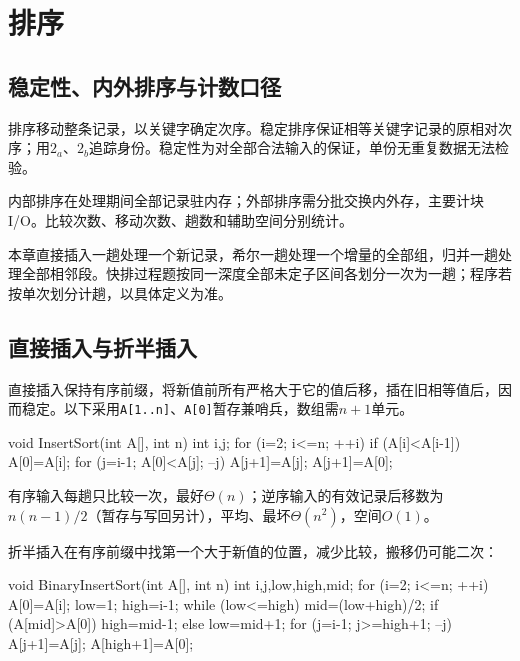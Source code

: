 \chapter{排序}\label{DS08}

\section{稳定性、内外排序与计数口径}\label{DS08-definition}

排序移动整条记录，以关键字确定次序。稳定排序保证相等关键字记录的原相对次序；用\(2_a、2_b\)追踪身份。稳定性为对全部合法输入的保证，单份无重复数据无法检验。

内部排序在处理期间全部记录驻内存；外部排序需分批交换内外存，主要计块I/O。比较次数、移动次数、趟数和辅助空间分别统计。

本章直接插入一趟处理一个新记录，希尔一趟处理一个增量的全部组，归并一趟处理全部相邻段。快排过程题按同一深度全部未定子区间各划分一次为一趟；程序若按单次划分计趟，以具体定义为准。

\section{直接插入与折半插入}\label{DS08-insertion}

直接插入保持有序前缀，将新值前所有严格大于它的值后移，插在旧相等值后，因而稳定。以下采用\texttt{A[\allowbreak{}1.\allowbreak{}.\allowbreak{}n]\allowbreak{}}、\texttt{A[\allowbreak{}0]\allowbreak{}}暂存兼哨兵，数组需\(n+1\)单元。

\par\smallskip\noindent\begin{minipage}{\linewidth}
\begin{codeblock}[language={C++}]
void InsertSort(int A[], int n) {
    int i,j;
    for (i=2; i<=n; ++i)
        if (A[i]<A[i-1]) {
            A[0]=A[i];
            for (j=i-1; A[0]<A[j]; --j)
                A[j+1]=A[j];
            A[j+1]=A[0];
        }
}
\end{codeblock}
\end{minipage}\par\smallskip

有序输入每趟只比较一次，最好\(\Theta(n)\)；逆序输入的有效记录后移数为\(n(n-1)/2\)（暂存与写回另计），平均、最坏\(\Theta(n^2)\)，空间\(O(1)\)。

折半插入在有序前缀中找第一个大于新值的位置，减少比较，搬移仍可能二次：

\par\smallskip\noindent\begin{minipage}{\linewidth}
\begin{codeblock}[language={C++}]
void BinaryInsertSort(int A[], int n) {
    int i,j,low,high,mid;
    for (i=2; i<=n; ++i) {
        A[0]=A[i];
        low=1; high=i-1;
        while (low<=high) {
            mid=(low+high)/2;
            if (A[mid]>A[0]) high=mid-1;
            else low=mid+1;
        }
        for (j=i-1; j>=high+1; --j) A[j+1]=A[j];
        A[high+1]=A[0];
    }
}
\end{codeblock}
\end{minipage}\par\smallskip

